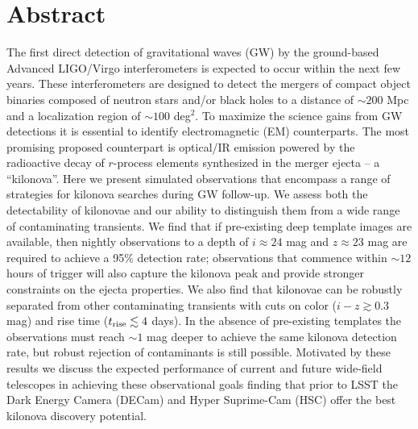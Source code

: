 
\clearpage
\section*{Abstract}
The first direct detection of gravitational waves (GW) by the ground-based Advanced LIGO/Virgo interferometers is expected to occur within the next few years. These interferometers are designed to detect the mergers of compact object binaries composed of neutron stars and/or black holes to a distance of $\sim 200$ Mpc and a localization region of $\sim 100$ deg$^2$.  To maximize the science gains from GW detections it is essential to identify electromagnetic (EM) counterparts. The most promising proposed counterpart is optical/IR emission powered by the radioactive decay of $r$-process elements synthesized in the merger ejecta -- a ``kilonova''.  Here we present simulated observations that encompass a range of strategies for kilonova searches during GW follow-up.  We assess both the detectability of kilonovae and our ability to distinguish them from a wide range of contaminating transients. We find that if pre-existing deep template images are available, then nightly observations to a depth of $i\approx 24$ mag and $z\approx 23$ mag are required to achieve a 95\% detection rate; observations that commence within $\sim 12$ hours of trigger will also capture the kilonova peak and provide stronger constraints on the ejecta properties.  We also find that kilonovae can be robustly separated from other contaminating transients with cuts on color ($i-z\gtrsim 0.3$ mag) and rise time ($t_{{\rm rise}}\lesssim 4$ days).  In the absence of pre-existing templates the observations must reach $\sim 1$ mag deeper to achieve the same kilonova detection rate, but robust rejection of contaminants is still possible.  Motivated by these results we discuss the expected performance of current and future wide-field telescopes in achieving these observational goals finding that prior to LSST the Dark Energy Camera (DECam) and Hyper Suprime-Cam (HSC) offer the best kilonova discovery potential.

